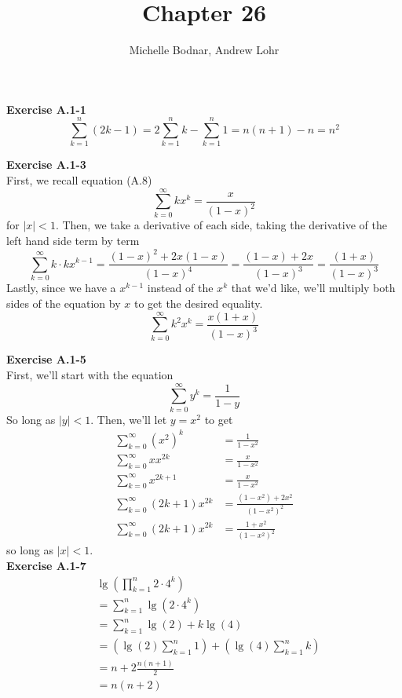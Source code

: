 \documentclass{article}
\title{Chapter 26}
\author{Michelle Bodnar, Andrew Lohr}
\begin{document}
\maketitle
\noindent\textbf{Exercise A.1-1}\\

\[
\sum_{k=1}^{n} (2k -1) = 2\sum_{k=1}^{n} k - \sum_{k=1}^n 1 = n(n+1) - n = n^2
\]

\noindent\textbf{Exercise A.1-3}\\
First, we recall equation (A.8)
\[
\sum_{k=0}^\infty k x^k = \frac{x}{(1-x)^2}
\]
for $|x|<1$. Then, we take a derivative of each side, taking the derivative of the left hand side term by term
\[
\sum_{k=0}^\infty k\cdot kx^{k-1} = \frac{(1-x)^2 + 2x (1-x)}{(1-x)^4} = \frac{(1-x) + 2x}{(1-x)^3} = \frac{(1+x)}{(1-x)^3}
\]
Lastly, since we have a $x^{k-1}$ instead of the $x^k$ that we'd like, we'll multiply both sides of the equation by $x$ to get the desired equality.
\[
\sum_{k=0}^\infty k^2 x^k = \frac{x(1+x)}{(1-x)^3}
\]

\noindent\textbf{Exercise A.1-5}\\

First, we'll start with the equation 
\[
\sum_{k=0}^\infty y^k = \frac{1}{1-y}
\]
So long as $|y|<1$. Then, we'll let $y = x^2$ to get 
\begin{align*}
\sum_{k=0}^\infty (x^2)^k &= \frac{1}{1-x^2}\\
\sum_{k=0}^\infty xx^{2k} &= \frac{x}{1-x^2}\\
\sum_{k=0}^\infty x^{2k+1} &= \frac{x}{1-x^2}\\
\sum_{k=0}^\infty (2k+1) x^{2k} &= \frac{(1-x^2) +2 x^2 }{(1-x^2)^2}\\
\sum_{k=0}^\infty (2k+1) x^{2k} &= \frac{1 +x^2 }{(1-x^2)^2}
\end{align*}
so long as $|x|<1$.\\

\noindent\textbf{Exercise A.1-7}\\

\begin{align*}
&\lg\left(\prod_{k=1}^n 2\cdot 4^k\right)\\
&=\sum_{k=1}^n \lg(2 \cdot 4^k) \\
&=\sum_{k=1}^n \lg(2) + k \lg(4) \\
&=\left(\lg(2) \sum_{k=1}^n 1\right) + \left(\lg(4) \sum_{k=1}^n k\right) \\
&=n + 2 \frac{n(n+1)}{2}\\
&= n(n+2)
\end{align*}
\end{document}

